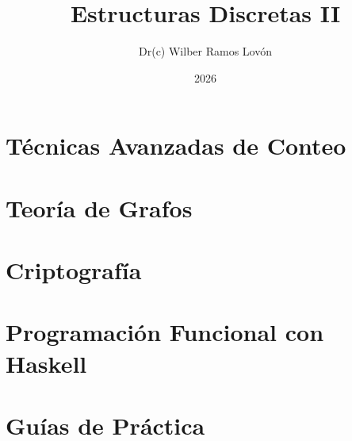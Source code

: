 \documentclass[12pt,openany]{book}
\title{Estructuras Discretas II}
\author{Dr(c) Wilber Ramos Lovón}
\date{2026}
\theoremstyle{definition}
\theoremstyle{plain}
\begin{document}
\frontmatter
\maketitle

\tableofcontents

\mainmatter

\part{Técnicas Avanzadas de Conteo}





\part{Teoría de Grafos}





\part{Criptografía}




\part{Programación Funcional con Haskell}





\part{Guías de Práctica}



\end{document}
